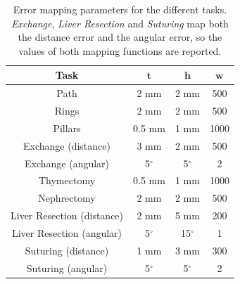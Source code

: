 \documentclass[../main.tex]{subfiles}
\begin{document}
\begin{table}
    \centering
    \caption{Error mapping parameters for the different tasks. \textit{Exchange}, \textit{Liver Resection} and \textit{Suturing} map both the distance error and the angular error, so the values of both mapping functions are reported.}
    \begin{tabular}{||c||c|c|c||}
        \hline
        \textbf{Task} & $\textbf{t} $ & $\textbf{h}$ & $\textbf{w}$ \\
        \hline\hline
        Path            & 2 mm & 2 mm & 500 \\ 
        \hline
        Rings           & 2 mm & 2 mm & 500 \\ 
        \hline
        Pillars         & 0.5 mm & 1 mm & 1000 \\ 
        \hline
        Exchange (distance)        & 3 mm & 2 mm & 500 \\ 
        \hline
        Exchange (angular)        & 5$^{\circ}$  & 5$^{\circ}$ & 2 \\ 
        \hline
        Thymectomy      & 0.5 mm & 1 mm & 1000 \\ 
        \hline
        Nephrectomy     & 2 mm & 2 mm & 500 \\ 
        \hline
        Liver Resection (distance) & 2 mm & 5 mm & 200 \\ 
        \hline
        Liver Resection (angular) & 5$^{\circ}$ & 15$^{\circ}$ & 1\\ 
        \hline
        Suturing (distance) & 1 mm & 3 mm & 300 \\ 
        \hline
        Suturing (angular) & 5$^{\circ}$ & 5$^{\circ}$ & 2\\ 
        \hline
    \end{tabular}
    \label{tab:thwvalues}
\end{table}
\end{document}
